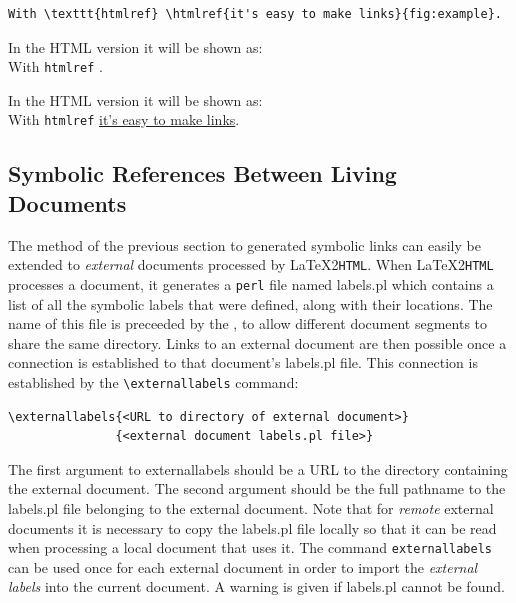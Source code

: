 \documentclass[dvips]{article}
\newcommand{\latextohtml}{\LaTeX 2\texttt{HTML}}
\newcommand{\fn}[1]{{\ttfamily #1}}	%
\begin{document}
\begin{small}
\begin{verbatim}
With \texttt{htmlref} \htmlref{it's easy to make links}{fig:example}.
\end{verbatim}
\end{small}

\begin{htmlonly}
In the HTML version it will be shown as: \\
With \texttt{htmlref} .
\end{htmlonly}
\begin{latexonly}
In the HTML version it will be shown as: \\
With \texttt{htmlref} \underline{it's easy to make links}.
\end{latexonly}
\subsection{Symbolic References Between Living Documents}
\label{external_cross}
\begin{changebar}
The method of the previous section to generated
symbolic  links can
easily be extended to \emph{external} documents
processed by \latextohtml.  When \latextohtml{}
processes a document, it generates a \texttt{perl} file named \fn{labels.pl}
which contains a list of all the symbolic labels that were defined, along with
their locations.  The name of this file is preceeded by
the , to allow different document segments
to share the same directory.  Links to an external
document are then possible once a connection is established
to that document's \fn{labels.pl} file.  This connection is
established by the \verb|\externallabels| command:
\end{changebar}

\begin{verbatim}
\externallabels{<URL to directory of external document>}
               {<external document labels.pl file>}
\end{verbatim}

The first argument to \fn{externallabels} should be a URL to 
the directory containing the external document.  
The second argument
should be the full pathname to the \fn{labels.pl} file belonging
to the external document.  Note that for \emph{remote} external documents
it is necessary to copy the \fn{labels.pl} file locally so that it
can be read when processing a local document that uses it.
The command \texttt{externallabels} can be used once for each external
document in order to import the 
\textit{external labels}\label{externallabels}
into the current document.
A warning is given if \fn{labels.pl} cannot be found.
\end{document}

